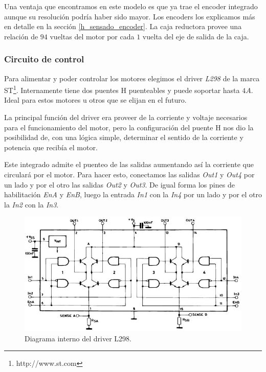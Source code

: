 Una ventaja que encontramos en este modelo es que ya trae el encoder integrado aunque su resoluci\'on podr\'ia haber sido mayor.
Los encoders los explicamos m\'as en detalle en la secci\'on \ref{h_sensado_encoder}.
La caja reductora provee una relaci\'on de $94$ vueltas del motor por cada $1$ vuelta del eje de salida de la caja.

\subsubsection{Circuito de control}
\label{h_actuadores_motorDC_circuito}

Para alimentar y poder controlar los motores elegimos el driver \emph{L298} de la marca ST\footnote{http://www.st.com}.
Internamente tiene dos puentes H puenteables y puede soportar hasta $4 A$. Ideal para estos motores u otros que se elijan en el futuro.

La principal funci\'on del driver era proveer de la corriente y voltaje necesarios para el funcionamiento del motor, pero la configuraci\'on
del puente H nos dio la posibilidad de, con una l\'ogica simple, determinar el sentido de la corriente y potencia que recib\'ia el motor.

Este integrado admite el puenteo de las salidas aumentando as\'i la corriente que circular\'a por el motor.
Para hacer esto, conectamos las salidas \emph{Out1} y \emph{Out4} por un lado y por el otro las salidas \emph{Out2} y \emph{Out3}.
De igual forma los pines de habilitaci\'on \emph{EnA} y \emph{EnB}, luego la entrada \emph{In1} con la \emph{In4} por un lado y
por el otro la \emph{In2} con la \emph{In3}.

\begin{figure}[ht]
	\centering
	\includegraphics[scale=0.40]{L298.png}
	\caption{Diagrama interno del driver L298.}
	\label{hF_l298}
\end{figure}

